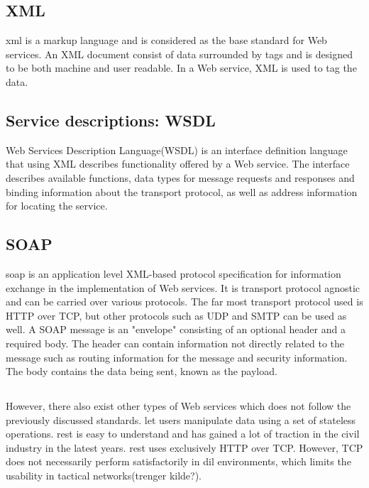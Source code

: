 \documentclass[USenglish]{ifimaster}
\begin{document}
\subsection{XML}
\gls{xml} is a markup language and is considered as the
base standard for Web services. An XML document consist of data surrounded by
tags and is designed to be both machine and user readable. In a Web service, XML
is used to tag the data.
\subsection{Service descriptions: WSDL}
Web Services Description Language(WSDL) is an interface definition language that
using XML describes functionality offered by a Web service. The interface
describes available functions, data types for message requests and responses and
binding information about the transport protocol, as well as address information
for locating the service.


\subsection{SOAP}

\gls{soap} is an application level XML-based protocol specification for
information exchange in the implementation of Web services. It is transport
protocol agnostic and can be carried over various protocols. The far most
transport protocol used is HTTP over TCP, but other protocols such as UDP and
SMTP can be used as well. A SOAP message is an "envelope" consisting of an
optional header and a required body. The header can contain information not
directly related to the message such as routing information for the message and
security information. The body contains the data being sent, known as the
payload.

\subsection{}
\label{rest}
However, there also exist other types of Web services which does not follow the
previously discussed standards.  let users manipulate data
using a set of stateless operations. \gls{rest} is easy to understand and has
gained a lot of traction in the civil industry in the latest years. \gls{rest}
uses exclusively HTTP over TCP. However, TCP does not necessarily perform
satisfactorily in \gls{dil} environments, which limits the usability in tactical
networks(trenger kilde?).
\end{document}
